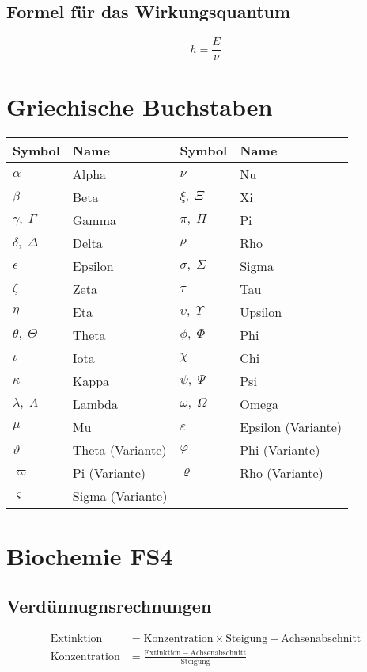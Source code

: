 \documentclass{article}
\begin{document}
\subsection{Formel für das Wirkungsquantum}
\begin{equation}
    h = \frac{E}{\nu}
\end{equation}


\section{Griechische Buchstaben}

\begin{center}
\begin{tabular}{ll|ll}
    \textbf{Symbol} & \textbf{Name} & \textbf{Symbol} & \textbf{Name} \\
    \hline
    $\alpha$ & Alpha & $\nu$ & Nu \\
    $\beta$ & Beta & $\xi,\;\Xi$ & Xi \\
    $\gamma,\;\Gamma$ & Gamma & $\pi,\;\Pi$ & Pi \\
    $\delta,\;\Delta$ & Delta & $\rho$ & Rho \\
    $\epsilon$ & Epsilon & $\sigma,\;\Sigma$ & Sigma \\
    $\zeta$ & Zeta & $\tau$ & Tau \\
    $\eta$ & Eta & $\upsilon,\;\Upsilon$ & Upsilon \\
    $\theta,\;\Theta$ & Theta & $\phi,\;\Phi$ & Phi \\
    $\iota$ & Iota & $\chi$ & Chi \\
    $\kappa$ & Kappa & $\psi,\;\Psi$ & Psi \\
    $\lambda,\;\Lambda$ & Lambda & $\omega,\;\Omega$ & Omega \\
    $\mu$ & Mu & $\varepsilon$ & Epsilon (Variante) \\
    $\vartheta$ & Theta (Variante) & $\varphi$ & Phi (Variante) \\
    $\varpi$ & Pi (Variante) & $\varrho$ & Rho (Variante) \\
    $\varsigma$ & Sigma (Variante) & & \\
\end{tabular}
\end{center}

\section{Biochemie FS4}

\subsection{Verdünnugnsrechnungen}

\begin{align}
    \mathrm{Extinktion} &= \mathrm{Konzentration} \times \mathrm{Steigung} + \mathrm{Achsenabschnitt}\\
    \mathrm{Konzentration} &= \frac{\mathrm{Extinktion} - \mathrm{Achsenabschnitt}}{\mathrm{Steigung}}
\end{align}
\end{document}
